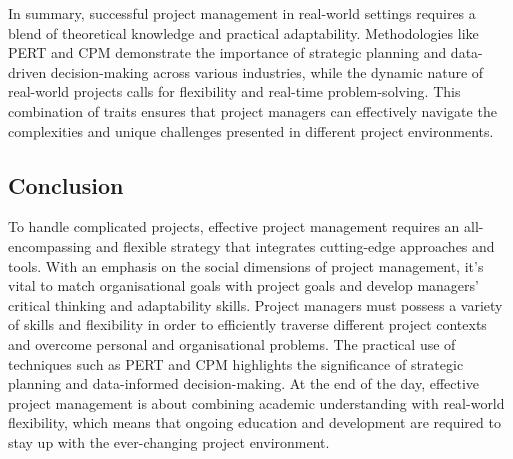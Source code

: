 \documentclass{article}
\begin{document}
In summary, successful project management in real-world settings requires a blend of theoretical knowledge and practical adaptability. Methodologies like PERT and CPM demonstrate the importance of strategic planning and data-driven decision-making across various industries, while the dynamic nature of real-world projects calls for flexibility and real-time problem-solving. This combination of traits ensures that project managers can effectively navigate the complexities and unique challenges presented in different project environments.

\subsection{Conclusion}

To handle complicated projects, effective project management requires an all-encompassing and flexible strategy that integrates cutting-edge approaches and tools. With an emphasis on the social dimensions of project management, it's vital to match organisational goals with project goals and develop managers' critical thinking and adaptability skills. Project managers must possess a variety of skills and flexibility in order to efficiently traverse different project contexts and overcome personal and organisational problems. The practical use of techniques such as PERT and CPM highlights the significance of strategic planning and data-informed decision-making. At the end of the day, effective project management is about combining academic understanding with real-world flexibility, which means that ongoing education and development are required to stay up with the ever-changing project environment.









\end{document}
